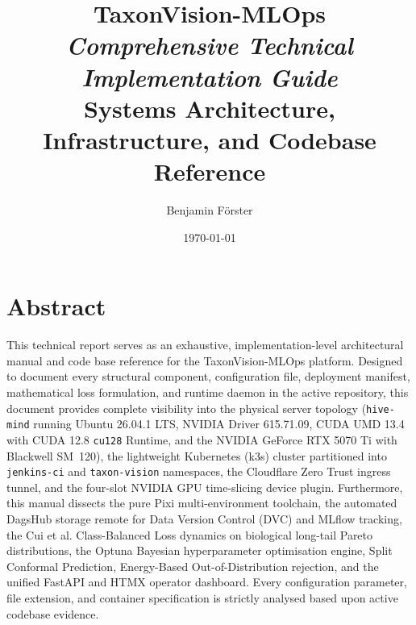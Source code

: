 \documentclass[10pt,a4paper,oneside]{book}
\title{\Huge \textbf{TaxonVision-MLOps}\\[0.5cm] 
\LARGE \textit{Comprehensive Technical Implementation Guide}\\[0.5cm]
\Large Systems Architecture, Infrastructure, and Codebase Reference}
\author{\Large Benjamin Förster}
\date{\today}
\begin{document}
\frontmatter
{}
\maketitle
{}

\chapter*{Abstract}
This technical report serves as an exhaustive, implementation-level architectural manual and code base reference for the TaxonVision-MLOps platform. Designed to document every structural component, configuration file, deployment manifest, mathematical loss formulation, and runtime daemon in the active repository, this document provides complete visibility into the physical server topology (\texttt{hive-mind} running Ubuntu 26.04.1 LTS, NVIDIA Driver 615.71.09, CUDA UMD 13.4 with CUDA 12.8 \texttt{cu128} Runtime, and the NVIDIA GeForce RTX 5070 Ti with Blackwell SM~120), the lightweight Kubernetes (k3s) cluster partitioned into \texttt{jenkins-ci} and \texttt{taxon-vision} namespaces, the Cloudflare Zero Trust ingress tunnel, and the four-slot NVIDIA GPU time-slicing device plugin. Furthermore, this manual dissects the pure Pixi multi-environment toolchain, the automated DagsHub storage remote for Data Version Control (DVC) and MLflow tracking, the Cui et al. Class-Balanced Loss dynamics on biological long-tail Pareto distributions, the Optuna Bayesian hyperparameter optimisation engine, Split Conformal Prediction, Energy-Based Out-of-Distribution rejection, and the unified FastAPI and HTMX operator dashboard. Every configuration parameter, file extension, and container specification is strictly analysed based upon active codebase evidence.

\tableofcontents

\mainmatter
\end{document}
